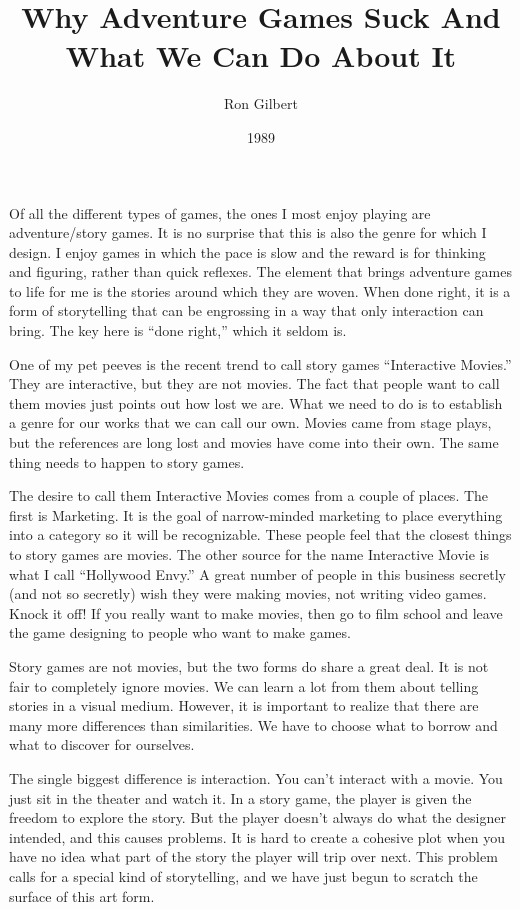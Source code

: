 \documentclass[12pt,letterpaper]{article}
\title{Why Adventure Games Suck And What We Can Do About It}
\date{1989}
\author{Ron Gilbert}
\begin{document}
\maketitle

\noindent Of all the different types of games, the ones I most enjoy playing are
adventure/story games. It is no surprise that this is also the genre for which
I design. I enjoy games in which the pace is slow and the reward is for
thinking and figuring, rather than quick reflexes. The element that brings
adventure games to life for me is the stories around which they are woven. When
done right, it is a form of storytelling that can be engrossing in a way that
only interaction can bring. The key here is ``done right,'' which it seldom is.

One of my pet peeves is the recent trend to call story games ``Interactive
Movies.'' They are interactive, but they are not movies. The fact that people
want to call them movies just points out how lost we are. What we need to do is
to establish a genre for our works that we can call our own. Movies came from
stage plays, but the references are long lost and movies have come into their
own. The same thing needs to happen to story games.

The desire to call them Interactive Movies comes from a couple of places. The
first is Marketing. It is the goal of narrow-minded marketing to place
everything into a category so it will be recognizable. These people feel that
the closest things to story games are movies. The other source for the name
Interactive Movie is what I call ``Hollywood Envy.'' A great number of people in
this business secretly (and not so secretly) wish they were making movies, not
writing video games. Knock it off! If you really want to make movies, then go
to film school and leave the game designing to people who want to make games.

Story games are not movies, but the two forms do share a great deal. It is not
fair to completely ignore movies. We can learn a lot from them about telling
stories in a visual medium. However, it is important to realize that there are
many more differences than similarities. We have to choose what to borrow and
what to discover for ourselves.

The single biggest difference is interaction. You can't interact with a movie.
You just sit in the theater and watch it. In a story game, the player is given
the freedom to explore the story. But the player doesn't always do what the
designer intended, and this causes problems. It is hard to create a cohesive
plot when you have no idea what part of the story the player will trip over
next. This problem calls for a special kind of storytelling, and we have just
begun to scratch the surface of this art form.
\end{document}
